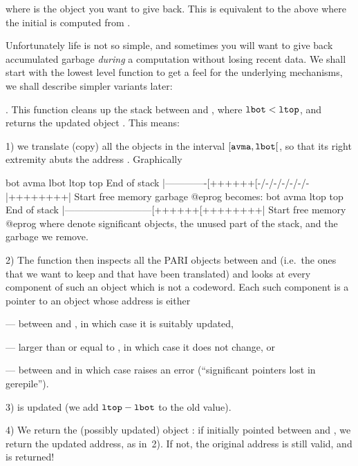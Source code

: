 
\noindent where  is the object you want to give back. This is
equivalent to the above where the initial  is computed from .

\noindent\item
Unfortunately life is not so simple, and sometimes you will want
to give back accumulated garbage \emph{during} a computation without losing
recent data. We shall start with the lowest level function to get a feel for
the underlying mechanisms, we shall describe simpler variants later:

. This function cleans
up the stack between  and , where ${\tt lbot} <
{\tt ltop}$, and returns the updated object . This means:

1) we translate (copy) all the objects in the interval
$[{\tt avma}, {\tt lbot}[$, so that its right extremity abuts the address
. Graphically

\vbox{\bprog
             bot           avma   lbot          ltop     top
End of stack  |-------------[++++++[-/-/-/-/-/-/-|++++++++|  Start
                free memory            garbage
@eprog
\noindent becomes:
\bprog
             bot                         avma   ltop     top
End of stack  |---------------------------[++++++[++++++++|  Start
                       free memory
@eprog
}
\noindent where \kbd{++} denote significant objects, \kbd{--} the unused part
of the stack, and \kbd{-/-} the garbage we remove.

2) The function then inspects all the PARI objects between  and
 (i.e.~the ones that we want to keep and that have been translated)
and looks at every component of such an object which is not a codeword. Each
such component is a pointer to an object whose address is either

--- between  and , in which case it is suitably updated,

--- larger than or equal to , in which case it does not change, or

--- between  and  in which case 
raises an error (``significant pointers lost in gerepile'').

3)  is updated (we add ${\tt ltop} - {\tt lbot}$ to the old value).

4) We return the (possibly updated) object : if  initially
pointed between  and , we return the updated address, as
in~2). If not, the original address is still valid, and is returned!

